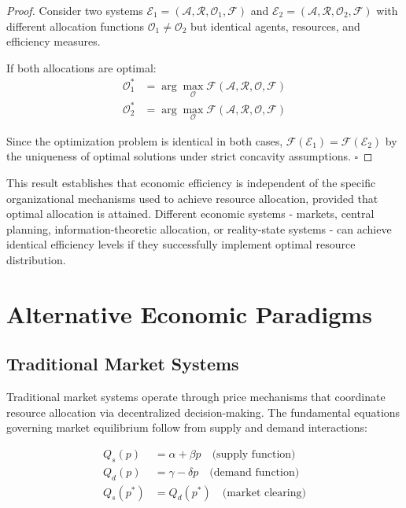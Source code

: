 \documentclass[12pt,a4paper]{article}
\begin{document}
\begin{proof}
Consider two systems $\mathcal{E}_1 = (\mathcal{A}, \mathcal{R}, \mathcal{O}_1, \mathcal{F})$ and $\mathcal{E}_2 = (\mathcal{A}, \mathcal{R}, \mathcal{O}_2, \mathcal{F})$ with different allocation functions $\mathcal{O}_1 \neq \mathcal{O}_2$ but identical agents, resources, and efficiency measures.

If both allocations are optimal:
\begin{align}
\mathcal{O}^*_1 &= \arg\max_{\mathcal{O}} \mathcal{F}(\mathcal{A}, \mathcal{R}, \mathcal{O}, \mathcal{F}) \\
\mathcal{O}^*_2 &= \arg\max_{\mathcal{O}} \mathcal{F}(\mathcal{A}, \mathcal{R}, \mathcal{O}, \mathcal{F})
\end{align}

Since the optimization problem is identical in both cases, $\mathcal{F}(\mathcal{E}_1) = \mathcal{F}(\mathcal{E}_2)$ by the uniqueness of optimal solutions under strict concavity assumptions. $\square$
\end{proof}

This result establishes that economic efficiency is independent of the specific organizational mechanisms used to achieve resource allocation, provided that optimal allocation is attained. Different economic systems - markets, central planning, information-theoretic allocation, or reality-state systems - can achieve identical efficiency levels if they successfully implement optimal resource distribution.

\section{Alternative Economic Paradigms}

\subsection{Traditional Market Systems}

Traditional market systems operate through price mechanisms that coordinate resource allocation via decentralized decision-making. The fundamental equations governing market equilibrium follow from supply and demand interactions:

\begin{align}
Q_s(p) &= \alpha + \beta p \quad \text{(supply function)} \\
Q_d(p) &= \gamma - \delta p \quad \text{(demand function)} \\
Q_s(p^*) &= Q_d(p^*) \quad \text{(market clearing)}
\end{align}
\end{document}
